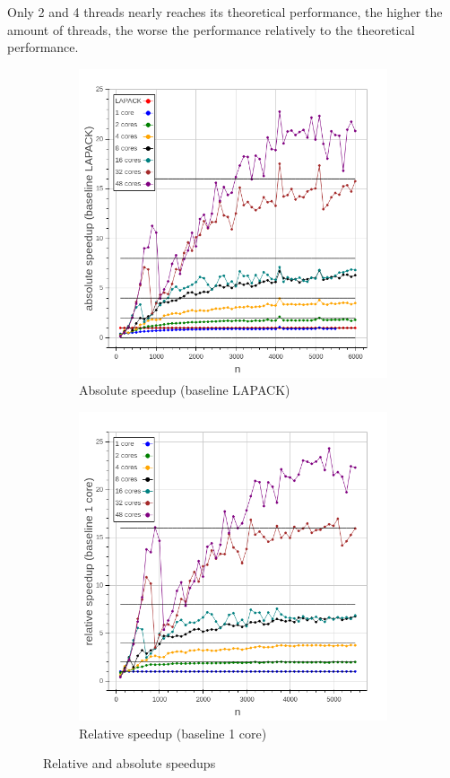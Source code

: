 \documentclass[a4paper,final,ngerman,english]{article}
\begin{document}
Only 2 and 4 threads nearly reaches its theoretical performance, the higher the amount of threads,
the worse the performance relatively to the theoretical performance.

\begin{figure}[h!]
	\centering
	\begin{subfigure}{0.46\textwidth}
	\includegraphics[width=\textwidth]{abs_speedup}
	\caption{Absolute speedup (baseline LAPACK)}
\label{fig:rel}
	\end{subfigure}
	\begin{subfigure}{0.46\textwidth}
	\includegraphics[width=\textwidth]{rel_speedup}
	\caption{Relative speedup (baseline 1 core)}
\label{fig:abs}
	\end{subfigure}
	\caption{Relative and absolute speedups}
\end{figure}
\end{document}
